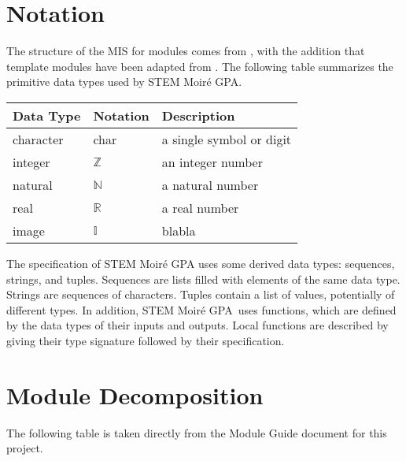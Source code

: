 \documentclass[12pt, titlepage]{article}
\newcommand{\progname}{STEM Moir{\'e} GPA}
\begin{document}
\section{Notation}

The structure of the MIS for modules comes from \cite{HoffmanAndStrooper1995},
with the addition that template modules have been adapted from
\cite{GhezziEtAl2003}. The following table summarizes the primitive data types used by \progname.

\iffalse
The mathematical notation comes from Chapter 3 of
\cite{HoffmanAndStrooper1995}.  For instance, the symbol := is used for a
multiple assignment statement and conditional rules follow the form $(c_1
\Rightarrow r_1 | c_2 \Rightarrow r_2 | ... | c_n \Rightarrow r_n )$.
\fi

\begin{center}
\renewcommand{\arraystretch}{1.2}
\noindent 
\begin{tabular}{l l p{7.5cm}} 
\toprule 
\textbf{Data Type} & \textbf{Notation} & \textbf{Description}\\ 
\midrule
character & char & a single symbol or digit\\
integer & $\mathbb{Z}$ & an integer number \\
natural & $\mathbb{N}$ & a natural number \\
real & $\mathbb{R}$ & a real number \\
image & $\mathbb{I}$ & blabla \\
\bottomrule
\end{tabular} 
\end{center}

\noindent
The specification of \progname{} uses some derived data types: sequences, strings, and
tuples. Sequences are lists filled with elements of the same data type. Strings
are sequences of characters. Tuples contain a list of values, potentially of
different types. In addition, \progname \ uses functions, which
are defined by the data types of their inputs and outputs. Local functions are
described by giving their type signature followed by their specification.

\section{Module Decomposition}

The following table is taken directly from the Module Guide document for this project.
\end{document}

